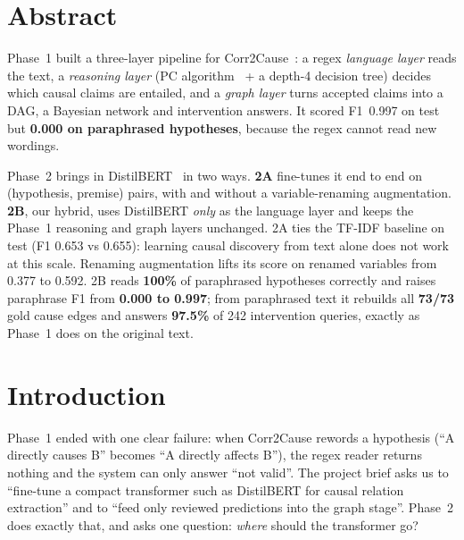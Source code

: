 \documentclass[12pt,a4paper]{article}
\begin{document}
\setcounter{page}{1}
\setcounter{tocdepth}{2}
\tableofcontents
\newpage

\section{Abstract}
Phase~1 built a three-layer pipeline for Corr2Cause~\cite{jin2024corr2cause}: a regex \emph{language layer} reads the
text, a \emph{reasoning layer} (PC algorithm~\cite{spirtes2000} + a depth-4 decision tree) decides which causal claims are
entailed, and a \emph{graph layer} turns accepted claims into a DAG, a Bayesian network and intervention answers. It scored
F1~0.997 on test but \textbf{0.000 on paraphrased hypotheses}, because the regex cannot read new wordings.

Phase~2 brings in DistilBERT~\cite{sanh2019} in two ways. \textbf{2A} fine-tunes it end to end on (hypothesis, premise)
pairs, with and without a variable-renaming augmentation. \textbf{2B}, our hybrid, uses DistilBERT \emph{only} as the
language layer and keeps the Phase~1 reasoning and graph layers unchanged. 2A ties the TF-IDF baseline on test
(F1 0.653 vs 0.655): learning causal discovery from text alone does not work at this scale. Renaming augmentation lifts its
score on renamed variables from 0.377 to 0.592. 2B reads \textbf{100\%} of paraphrased hypotheses correctly and raises
paraphrase F1 from \textbf{0.000 to 0.997}; from paraphrased text it rebuilds all \textbf{73/73} gold cause edges and
answers \textbf{97.5\%} of 242 intervention queries, exactly as Phase~1 does on the original text.

\section{Introduction}

Phase~1 ended with one clear failure: when Corr2Cause rewords a hypothesis (``A directly causes B'' becomes
``A directly affects B''), the regex reader returns nothing and the system can only answer ``not valid''. The project
brief asks us to ``fine-tune a compact transformer such as DistilBERT for causal relation extraction'' and to
``feed only reviewed predictions into the graph stage''. Phase~2 does exactly that, and asks one question: \emph{where}
should the transformer go?
\end{document}

